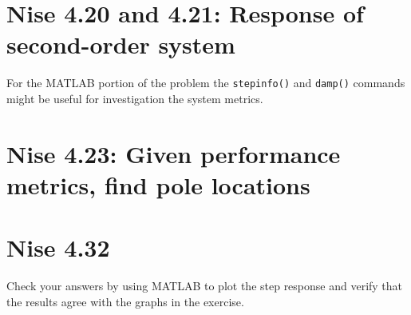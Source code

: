 \documentclass[11pt]{article}
\begin{document}
\section*{Nise 4.20 and 4.21: Response of second-order system}

For the MATLAB portion of the problem the \texttt{stepinfo()} and \texttt{damp()} commands might be useful for investigation the system metrics.

\section*{Nise 4.23: Given performance metrics, find pole locations}

\section*{Nise 4.32}

Check your answers by using MATLAB to plot the step response and verify that the results agree with the graphs in the exercise.
\end{document}
